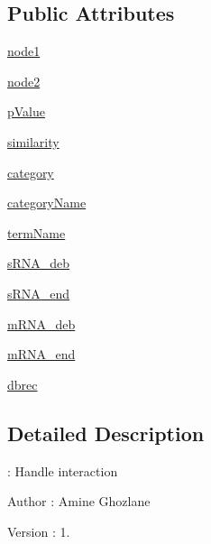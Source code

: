 \subsection*{\-Public \-Attributes}
\begin{DoxyCompactItemize}
\item 
\hyperlink{classirna_1_1David2tulip_1_1Edge_1_1Edge_a7afc4f74d56349218400a13b01f339f9}{node1}
\item 
\hyperlink{classirna_1_1David2tulip_1_1Edge_1_1Edge_a4424ff6566a621a7ce957420951c6848}{node2}
\item 
\hyperlink{classirna_1_1David2tulip_1_1Edge_1_1Edge_ae3487cfb89ccdeabe9f78b5cf30486ab}{p\-Value}
\item 
\hyperlink{classirna_1_1David2tulip_1_1Edge_1_1Edge_a555cf620a2a67e6ba6bf823b9e0aeca6}{similarity}
\item 
\hyperlink{classirna_1_1David2tulip_1_1Edge_1_1Edge_a47340e9ffb1f5e9023e5b1b18f370c4d}{category}
\item 
\hyperlink{classirna_1_1David2tulip_1_1Edge_1_1Edge_a68972a7c38a28d6e4b8369e790b2faed}{category\-Name}
\item 
\hyperlink{classirna_1_1David2tulip_1_1Edge_1_1Edge_af03bd8fdf12411e153ae3930d2a76033}{term\-Name}
\item 
\hyperlink{classirna_1_1David2tulip_1_1Edge_1_1Edge_a8d50910e327c50ea1a897f346819defe}{s\-R\-N\-A\-\_\-deb}
\item 
\hyperlink{classirna_1_1David2tulip_1_1Edge_1_1Edge_a10fc020d77ce4ee921384f8f197b122e}{s\-R\-N\-A\-\_\-end}
\item 
\hyperlink{classirna_1_1David2tulip_1_1Edge_1_1Edge_a1dd5c8113e30a5e5e4a49cdf53237406}{m\-R\-N\-A\-\_\-deb}
\item 
\hyperlink{classirna_1_1David2tulip_1_1Edge_1_1Edge_a57e44ba68456a6e965e68688092e0ae2}{m\-R\-N\-A\-\_\-end}
\item 
\hyperlink{classirna_1_1David2tulip_1_1Edge_1_1Edge_aa236684b35562f37fb9fb68219e77d51}{dbrec}
\end{DoxyCompactItemize}


\subsection{\-Detailed \-Description}
\-: \-Handle interaction 

\begin{DoxyAuthor}{\-Author}
\-: \-Amine \-Ghozlane 
\end{DoxyAuthor}
\begin{DoxyVersion}{\-Version}
\-: 1. 
\end{DoxyVersion}


